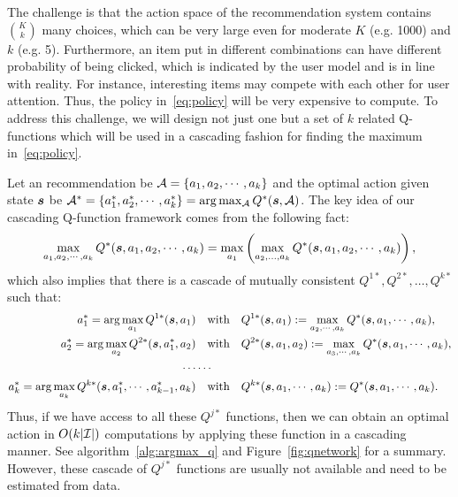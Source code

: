 \documentclass{article} %
\newcommand{\Le}[1]{{\color{red}{\bf\sf [ #1]}}}
\begin{document}
The challenge is that the action space of the recommendation system contains ${K \choose k}$ many choices, which can be very large even for moderate $K$ (e.g. 1000) and $k$ (e.g. 5). Furthermore, an item put in different combinations can have different probability of being clicked, which is indicated by the user model and is in line with reality. For instance, interesting items may compete with each other for user attention. Thus, the policy in~\eqref{eq:policy} will be very expensive to compute. To address this challenge, we will design not just one but a set of $k$ related Q-functions which will be used in a cascading fashion for finding the maximum in~\eqref{eq:policy}. 

Let an recommendation be ${\mathcal{A}}=\{a_1, a_2,\cdots, a_k\}$ and the optimal action given state ${\bm{s}}$ be ${\mathcal{A}}^* =\{a_1^*, a_2^*, \cdots, a_k^*\} =\arg\max_{{\mathcal{A}}} Q^*(
{\bm{s}}, {\mathcal{A}})$. The key idea of our cascading Q-function framework comes from the following fact:
{\small \begin{equation}\label{eq:max_decomp}
\max_{a_1,a_2,\cdots,a_k}Q^*({\bm{s}},a_1,a_2,\cdots,a_k) = \max_{a_1}\left( \max_{a_2,\ldots,a_k}Q^*({\bm{s}},a_1,a_2,\cdots,a_k) \right),
\end{equation}}
which also implies that there is a cascade of mutually consistent $Q^{1*},Q^{2*},\ldots,Q^{k*}$ such that: 
{\small \begin{align*}
    a_1^* =\arg \max_{a_1}Q^{1*}({\bm{s}}, a_1) & \quad\text{with}\quad\displaystyle Q^{1*}({\bm{s}}, a_1):=\max_{a_2,\cdots,a_k}Q^*({\bm{s}},a_1,\cdots, a_k),  \\
      a_2^* =\arg \max_{a_2}Q^{2*}({\bm{s}}, a_1^*, a_2) & \quad\text{with}\quad \displaystyle Q^{2*}({\bm{s}}, a_1, a_2):=\max_{a_3,\cdots,a_k}Q^*({\bm{s}},a_1,\cdots, a_k), \\
      \cdots & \cdots \nonumber\\
      a_k^* = \arg \max_{a_k}Q^{k*}({\bm{s}}, a_1^*,\cdots,a_{k-1}^*, a_k) & \quad\text{with}\quad Q^{k*}({\bm{s}}, a_1, \cdots,a_k):=Q^*({\bm{s}},a_1,\cdots, a_k).  
\end{align*}}
Thus, if we have access to all these $Q^{j*}$ functions, then we can obtain an optimal action in $O(k|{\mathcal{I}}|)$ computations by applying these function in a cascading manner. See algorithm~\ref{alg:argmax_q} and Figure~\ref{fig:qnetwork} for a summary. However, these cascade of $Q^{j*}$ functions are usually not available and need to be estimated from data. 
\end{document}
